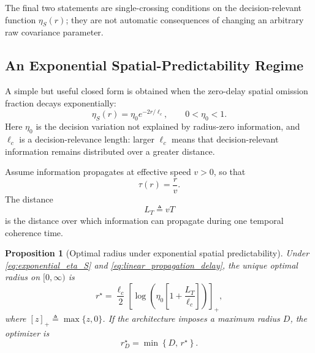 \documentclass[11pt]{article}
\newtheorem{proposition}{Proposition}
\begin{document}
The final two statements are single-crossing conditions on the
decision-relevant function $\eta_S(r)$; they are not automatic consequences
of changing an arbitrary raw covariance parameter.

\subsection{An Exponential Spatial-Predictability Regime}
\label{subsec:exponential_predictability_regime}

A simple but useful closed form is obtained when the zero-delay spatial
omission fraction decays exponentially:
\begin{equation}
    \eta_S(r)
    =
    \eta_0
    e^{-2r/\ell_c},
    \qquad
    0<\eta_0<1.
    \label{eq:exponential_eta_S}
\end{equation}
Here $\eta_0$ is the decision variation not explained by radius-zero
information, and $\ell_c$ is a decision-relevance length: larger $\ell_c$
means that decision-relevant information remains distributed over a greater
distance.

Assume information propagates at effective speed $v>0$, so that
\begin{equation}
    \tau(r)
    =
    \frac{r}{v}.
    \label{eq:linear_propagation_delay}
\end{equation}
The distance
\begin{equation}
    L_T
    \triangleq
    vT
    \label{eq:temporal_propagation_length}
\end{equation}
is the distance over which information can propagate during one temporal
coherence time.

\begin{proposition}[Optimal radius under exponential spatial predictability]
\label{prop:generic_exponential_radius}
Under \eqref{eq:exponential_eta_S} and
\eqref{eq:linear_propagation_delay}, the unique optimal radius on
$[0,\infty)$ is
\begin{equation}
    \boxed{
    r^\star
    =
    \frac{\ell_c}{2}
    \left[
        \log
        \left(
            \eta_0
            \left[
                1+\frac{L_T}{\ell_c}
            \right]
        \right)
    \right]_+,
    }
    \label{eq:generic_exponential_rstar}
\end{equation}
where $[z]_+\triangleq\max\{z,0\}$. If the architecture imposes a maximum
radius $D$, the optimizer is
\begin{equation}
    r_D^\star
    =
    \min
    \left\{
        D,\,
        r^\star
    \right\}.
    \label{eq:capped_generic_rstar}
\end{equation}
\end{proposition}
\end{document}
